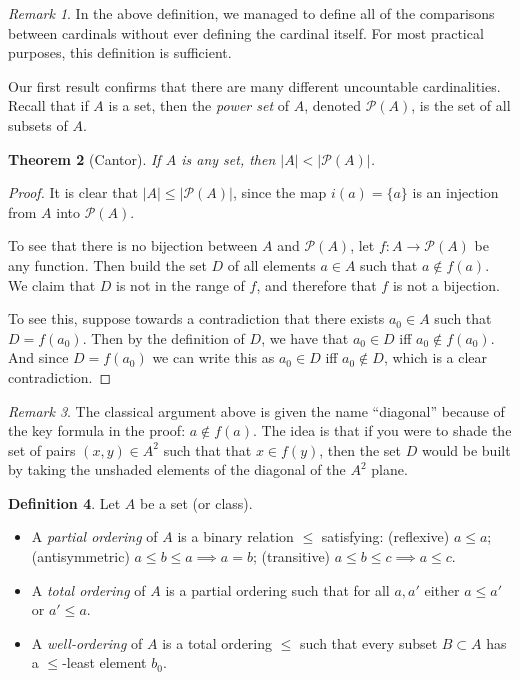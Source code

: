 \documentclass[11pt,oneside]{amsbook}
\theoremstyle{definition}
\theoremstyle{plain}
\newtheorem{thm}{Theorem}[section]
\theoremstyle{definition}
\newtheorem{defn}[thm]{Definition}
\theoremstyle{remark}
\newtheorem{rem}[thm]{Remark}
\numberwithin{equation}{section}
\numberwithin{figure}{section}
\begin{document}
\begin{rem}
  In the above definition, we managed to define all of the comparisons between cardinals without ever defining the cardinal itself. For most practical purposes, this definition is sufficient.
\end{rem}

Our first result confirms that there are many different uncountable cardinalities. Recall that if $A$ is a set, then the \emph{power set} of $A$, denoted $\mathcal P(A)$, is the set of all subsets of $A$.

\begin{thm}[Cantor]
  If $A$ is any set, then $|A|<|\mathcal P(A)|$.
\end{thm}

\begin{proof}
  It is clear that $|A|\leq|\mathcal P(A)|$, since the map $i(a)=\{a\}$ is an injection from $A$ into $\mathcal P(A)$.

  To see that there is no bijection between $A$ and $\mathcal P(A)$, let $f\colon A\to\mathcal P(A)$ be any function. Then build the set $D$ of all elements $a\in A$ such that $a\notin f(a)$. We claim that $D$ is not in the range of $f$, and therefore that $f$ is not a bijection.

  To see this, suppose towards a contradiction that there exists $a_0\in A$ such that $D=f(a_0)$. Then by the definition of $D$, we have that $a_0\in D$ iff $a_0\notin f(a_0)$. And since $D=f(a_0)$ we can write this as $a_0\in D$ iff $a_0\notin D$, which is a clear contradiction.
\end{proof}

\begin{rem}
  The classical argument above is given the name ``diagonal'' because of the key formula in the proof: $a\notin f(a)$. The idea is that if you were to shade the set of pairs $(x,y)\in A^2$ such that that $x\in f(y)$, then the set $D$ would be built by taking the unshaded elements of the diagonal of the $A^2$ plane.
\end{rem}

\begin{defn}
  Let $A$ be a set (or class).
  \begin{itemize}
  \item A \emph{partial ordering} of $A$ is a binary relation $\leq$ satisfying: (reflexive) $a\leq a$; (antisymmetric) $a\leq b\leq a\implies a=b$; (transitive) $a\leq b\leq c\implies a\leq c$.
  \item A \emph{total ordering} of $A$ is a partial ordering such that for all $a,a'$ either $a\leq a'$ or $a'\leq a$.
  \item A \emph{well-ordering} of $A$ is a total ordering $\leq$ such that every subset $B\subset A$ has a $\leq$-least element $b_0$.
  \end{itemize}
\end{defn}
\end{document}
